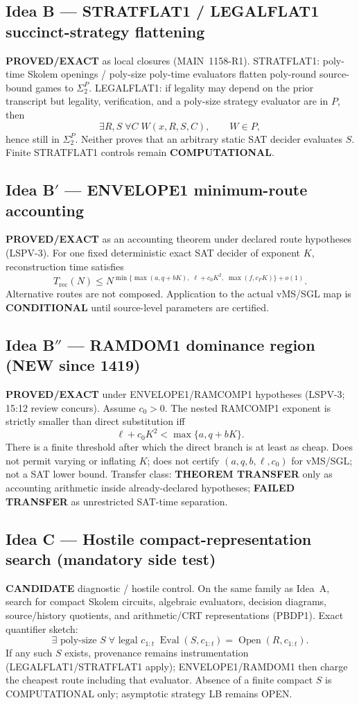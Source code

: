 \documentclass[11pt]{article}
\begin{document}
\subsection*{Idea B --- STRATFLAT1 / LEGALFLAT1 succinct-strategy flattening}
\textbf{PROVED/EXACT} as local closures (MAIN~1158-R1).
STRATFLAT1: poly-time Skolem openings / poly-size poly-time evaluators flatten poly-round
source-bound games to $\Sigma_2^P$.
LEGALFLAT1: if legality may depend on the prior transcript but legality, verification, and a
poly-size strategy evaluator are in $P$, then
\[
\exists R,S\;\forall C\;W(x,R,S,C),\qquad W\in P,
\]
hence still in $\Sigma_2^P$. Neither proves that an arbitrary static SAT decider evaluates $S$.
Finite STRATFLAT1 controls remain \textbf{COMPUTATIONAL}.

\subsection*{Idea B$'$ --- ENVELOPE1 minimum-route accounting}
\textbf{PROVED/EXACT} as an accounting theorem under declared route hypotheses (LSPV-3).
For one fixed deterministic exact SAT decider of exponent $K$, reconstruction time satisfies
\[
T_{\mathrm{rec}}(N)\le N^{\min\{\max(a,q+bK),\;\ell+c_0K^2,\;\max(f,c_FK)\}+o(1)}.
\]
Alternative routes are not composed. Application to the actual vMS/SGL map is
\textbf{CONDITIONAL} until source-level parameters are certified.

\subsection*{Idea B$''$ --- RAMDOM1 dominance region (NEW since 1419)}
\textbf{PROVED/EXACT} under ENVELOPE1/RAMCOMP1 hypotheses (LSPV-3; 15:12 review concurs).
Assume $c_0>0$. The nested RAMCOMP1 exponent is strictly smaller than direct substitution iff
\[
\ell+c_0K^2<\max\{a,q+bK\}.
\]
There is a finite threshold after which the direct branch is at least as cheap. Does not
permit varying or inflating $K$; does not certify $(a,q,b,\ell,c_0)$ for vMS/SGL; not a SAT
lower bound. Transfer class: \textbf{THEOREM TRANSFER} only as accounting arithmetic inside
already-declared hypotheses; \textbf{FAILED TRANSFER} as unrestricted SAT-time separation.

\subsection*{Idea C --- Hostile compact-representation search (mandatory side test)}
\textbf{CANDIDATE} diagnostic / hostile control. On the same family as Idea~A, search for
compact Skolem circuits, algebraic evaluators, decision diagrams, source/history quotients,
and arithmetic/CRT representations (PBDP1). Exact quantifier sketch:
\[
\exists\text{ poly-size }S\;\forall\text{ legal }c_{1:t}\;
\operatorname{Eval}(S,c_{1:t})=\operatorname{Open}(R,c_{1:t}).
\]
If any such $S$ exists, provenance remains instrumentation (LEGALFLAT1/STRATFLAT1 apply);
ENVELOPE1/RAMDOM1 then charge the cheapest route including that evaluator. Absence of a finite
compact $S$ is COMPUTATIONAL only; asymptotic strategy LB remains OPEN.
\end{document}

